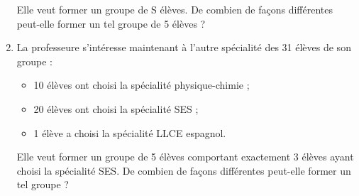 \begin{enumerate}
	Elle veut former un groupe de S élèves. De combien de façons différentes peut-elle former 
	un tel groupe de 5 élèves ?
	
	\smallskip
	
	
	\pagebreak
	\item La professeure s'intéresse maintenant à l'autre spécialité des 31 élèves de son groupe :
	
	\begin{itemize}
		\item 10 élèves ont choisi la spécialité physique-chimie ;
		\item 20 élèves ont choisi la spécialité SES ;
		\item 1 élève a choisi la spécialité LLCE espagnol.
	\end{itemize}
	
	Elle veut former un groupe de 5 élèves comportant exactement 3 élèves ayant choisi la
	spécialité SES. De combien de façons différentes peut-elle former un tel groupe ?
	
	\smallskip
	
\end{enumerate}